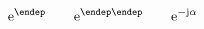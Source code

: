 \documentclass[a4paper,12pt,fleqn]{article}
\def\imaginaryunit{j}                  %
\def\imunit{\mathrm{\imaginaryunit}}   %
\def\ce{\mathrm{e}}                    %
\newcommand\epowim[1]{\ce^{\epowimaux#1\endep}}
\def\epowimaux#1#2\endep{\ifx-#1\relax-\imunit\else\if\imaginaryunit j\relax\,\fi\imunit#1\fi#2}
\begin{document}
\begin{equation}
\epowim{\alpha}\qquad \epowim{-\alpha} \qquad \ce^{-\imunit\alpha}
\end{equation}
\end{document}
